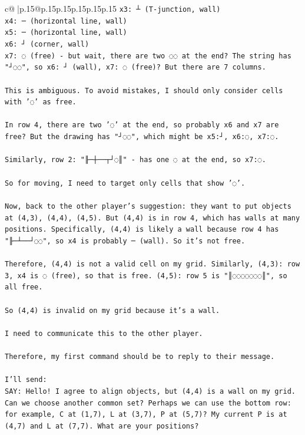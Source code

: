 \documentclass{article}
\begin{document}
{\begin{supertabular}{c@{$\;$}|p{.15\linewidth}@{}p{.15\linewidth}p{.15\linewidth}p{.15\linewidth}p{.15\linewidth}p{.15\linewidth}}
{{{\texttt{x3: ┴ (T{-}junction, wall)} \\
\texttt{x4: ─ (horizontal line, wall)} \\
\texttt{x5: ─ (horizontal line, wall)} \\
\texttt{x6: ┘ (corner, wall)} \\
\texttt{x7: ◌ (free) {-} but wait, there are two ◌◌ at the end? The string has "┘◌◌", so x6: ┘ (wall), x7: ◌ (free)? But there are 7 columns.} \\
\\ 
\texttt{This is ambiguous. To avoid mistakes, I should only consider cells with '◌' as free.} \\
\\ 
\texttt{In row 4, there are two '◌' at the end, so probably x6 and x7 are free? But the drawing has "┘◌◌", which might be x5:┘, x6:◌, x7:◌.} \\
\\ 
\texttt{Similarly, row 2: "╟─┼──┬┘◌║" {-} has one ◌ at the end, so x7:◌.} \\
\\ 
\texttt{So for moving, I need to target only cells that show '◌'.} \\
\\ 
\texttt{Now, back to the other player's suggestion: they want to put objects at (4,3), (4,4), (4,5). But (4,4) is in row 4, which has walls at many positions. Specifically, (4,4) is likely a wall because row 4 has "╟─┴──┘◌◌", so x4 is probably ─ (wall). So it's not free.} \\
\\ 
\texttt{Therefore, (4,4) is not a valid cell on my grid. Similarly, (4,3): row 3, x4 is ◌ (free), so that is free. (4,5): row 5 is "║◌◌◌◌◌◌◌║", so all free.} \\
\\ 
\texttt{So (4,4) is invalid on my grid because it's a wall.} \\
\\ 
\texttt{I need to communicate this to the other player.} \\
\\ 
\texttt{Therefore, my first command should be to reply to their message.} \\
\\ 
\texttt{I'll send:} \\
\texttt{SAY: Hello! I agree to align objects, but (4,4) is a wall on my grid. Can we choose another common set? Perhaps we can use the bottom row: for example, C at (1,7), L at (3,7), P at (5,7)? My current P is at (4,7) and L at (7,7). What are your positions?} \\
}}}
\end{supertabular}}
\end{document}
